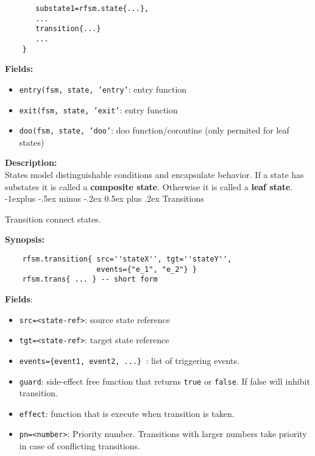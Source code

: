 \documentclass[10pt,landscape]{article}
\makeatletter
\renewcommand{\subsection}{\@startsection{subsection}{2}{0mm}%
                                {-1explus -.5ex minus -.2ex}%
                                {0.5ex plus .2ex}%
                                {\normalfont\small\bfseries}}
\makeatother
\begin{document}
\begin{multicols}{3}
\begin{verbatim}
       substate1=rfsm.state{...},
       ...
       transition{...}
       ...
    }
\end{verbatim}


\textbf{Fields:}\\
\begin{itemize}
\item \texttt{entry(fsm, state, 'entry'}: entry function
\item \texttt{exit(fsm, state, 'exit'}: entry function
\item \texttt{doo(fsm, state, 'doo'}: doo function/coroutine (only permited for leaf states)
\end{itemize}


\textbf{Description:}\\
States model distinguishable conditions and encapsulate behavior. If a
state has substates it is called a \textbf{composite state}. Otherwise
it is
called a \textbf{leaf state}.\\

\subsection{Transitions}

Transition connect states.

\textbf{Synopsis:}\\

\begin{verbatim}
    rfsm.transition{ src=''stateX'', tgt=''stateY'',
                     events={"e_1", "e_2"} }
    rfsm.trans{ ... } -- short form
\end{verbatim}

\textbf{Fields}:\\
\begin{itemize}
\item \texttt{src=<state-ref>}: source state reference
\item \texttt{tgt=<state-ref>}: target state reference
\item \texttt{events=\{event1, event2, ...\} }: list of triggering
  events.
\item \texttt{guard}: side-effect free function that returns
  \texttt{true} or \texttt{false}. If false will inhibit transition.
\item \texttt{effect}: function that is execute when transition is taken.
\item \texttt{pn=<number>}: Priority number. Transitions with larger
  numbers take priority in case of conflicting transitions.
\end{itemize}


\end{multicols}
\end{document}
